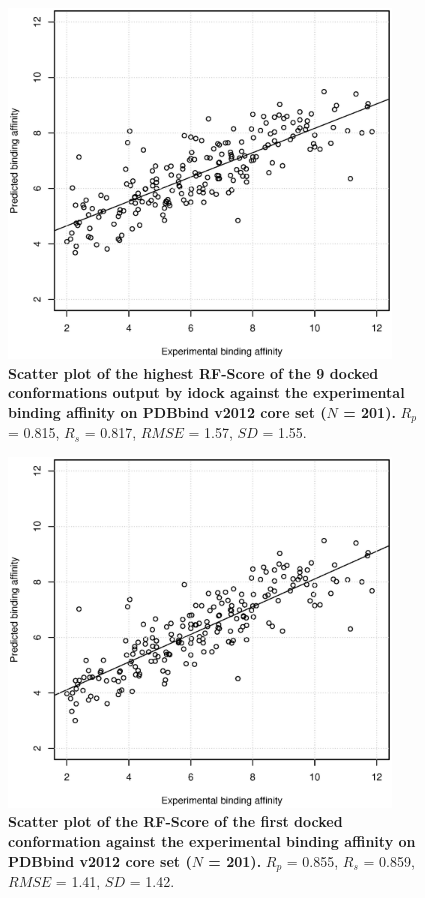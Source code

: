 \documentclass[10pt]{article}
\begin{document}
\begin{figure}[!ht]
\begin{center}
\includegraphics[width=4in]{pK-idockConfsRFScoreMax.eps}
\end{center}
\caption{
{\bf Scatter plot of the highest RF-Score of the 9 docked conformations output by idock against the experimental binding affinity on PDBbind v2012 core set ($N$ = 201).} $R_p$ = 0.815, $R_s$ = 0.817, $RMSE$ = 1.57, $SD$ = 1.55.
}
\label{pK-idockConfsRFScoreMax}
\end{figure}

\begin{figure}[!ht]
\begin{center}
\includegraphics[width=4in]{pK-idockConf1RFScore.eps}
\end{center}
\caption{
{\bf Scatter plot of the RF-Score of the first docked conformation against the experimental binding affinity on PDBbind v2012 core set ($N$ = 201).} $R_p$ = 0.855, $R_s$ = 0.859, $RMSE$ = 1.41, $SD$ = 1.42.
}
\label{pK-idockConf1RFScore}
\end{figure}
\end{document}
